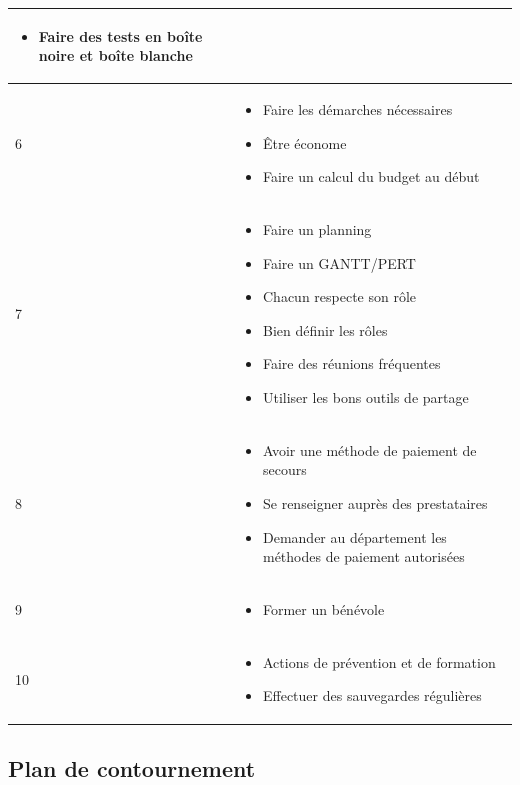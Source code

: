 \begin{longtable}{|p{7cm}|p{7cm}|}
\begin{itemize}
		\item Faire des tests en boîte noire et boîte blanche
	\end{itemize} \\
	\hline
	6 & \begin{itemize}
		\item Faire les démarches nécessaires
		\item Être économe
		\item Faire un calcul du budget au début
	\end{itemize} \\
	\hline
	7 & \begin{itemize}
		\item Faire un planning
		\item Faire un GANTT/PERT
		\item Chacun respecte son rôle
		\item Bien définir les rôles
		\item Faire des réunions fréquentes
		\item Utiliser les bons outils de partage
	\end{itemize} \\
	\hline
	8 & \begin{itemize}
		\item Avoir une méthode de paiement de secours
		\item Se renseigner auprès des prestataires
		\item Demander au département les méthodes de paiement autorisées
	\end{itemize} \\
	\hline
	9 & \begin{itemize}
		\item Former un bénévole
	\end{itemize} \\
	\hline
	10 & \begin{itemize}
		\item Actions de prévention et de formation
		\item Effectuer des sauvegardes régulières
	\end{itemize} \\
	\hline
	\end{longtable}

\flushleft
\subsection*{Plan de contournement}

